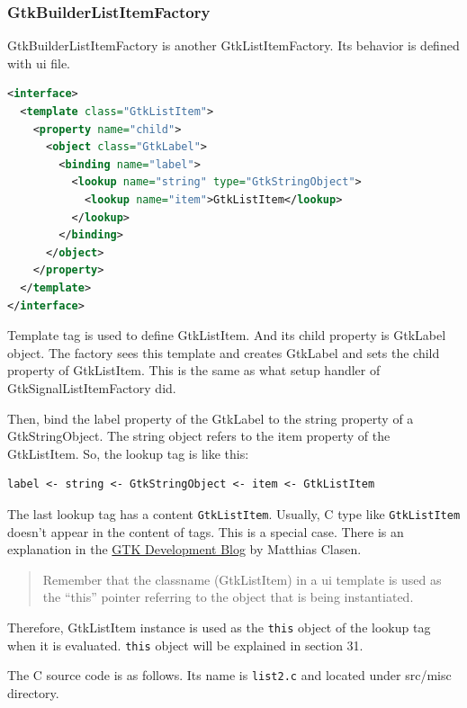 \subsubsection{GtkBuilderListItemFactory}\label{gtkbuilderlistitemfactory}

GtkBuilderListItemFactory is another GtkListItemFactory. Its behavior is
defined with ui file.

\begin{lstlisting}[language=XML]
<interface>
  <template class="GtkListItem">
    <property name="child">
      <object class="GtkLabel">
        <binding name="label">
          <lookup name="string" type="GtkStringObject">
            <lookup name="item">GtkListItem</lookup>
          </lookup>
        </binding>
      </object>
    </property>
  </template>
</interface>
\end{lstlisting}

Template tag is used to define GtkListItem. And its child property is
GtkLabel object. The factory sees this template and creates GtkLabel and
sets the child property of GtkListItem. This is the same as what setup
handler of GtkSignalListItemFactory did.

Then, bind the label property of the GtkLabel to the string property of
a GtkStringObject. The string object refers to the item property of the
GtkListItem. So, the lookup tag is like this:

\begin{lstlisting}
label <- string <- GtkStringObject <- item <- GtkListItem
\end{lstlisting}

The last lookup tag has a content \passthrough{\lstinline!GtkListItem!}.
Usually, C type like \passthrough{\lstinline!GtkListItem!} doesn't
appear in the content of tags. This is a special case. There is an
explanation in the
\href{https://blog.gtk.org/2020/09/05/a-primer-on-gtklistview/}{GTK
Development Blog} by Matthias Clasen.

\begin{quote}
Remember that the classname (GtkListItem) in a ui template is used as
the ``this'' pointer referring to the object that is being instantiated.
\end{quote}

Therefore, GtkListItem instance is used as the
\passthrough{\lstinline!this!} object of the lookup tag when it is
evaluated. \passthrough{\lstinline!this!} object will be explained in
section 31.

The C source code is as follows. Its name is
\passthrough{\lstinline!list2.c!} and located under src/misc directory.

